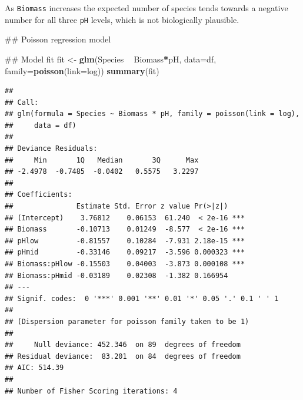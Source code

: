 \documentclass[]{book}
\newenvironment{Shaded}{\begin{snugshade}}{\end{snugshade}}
\newcommand{\KeywordTok}[1]{\textcolor[rgb]{0.13,0.29,0.53}{\textbf{#1}}}
\newcommand{\DataTypeTok}[1]{\textcolor[rgb]{0.13,0.29,0.53}{#1}}
\newcommand{\StringTok}[1]{\textcolor[rgb]{0.31,0.60,0.02}{#1}}
\newcommand{\OperatorTok}[1]{\textcolor[rgb]{0.81,0.36,0.00}{\textbf{#1}}}
\newcommand{\NormalTok}[1]{#1}
\theoremstyle{definition}
\theoremstyle{definition}
\theoremstyle{definition}
\theoremstyle{remark}
\begin{document}
As \texttt{Biomass} increases the expected number of species tends
towards a negative number for all three \texttt{pH} levels, which is not
biologically plausible.

\begin{Shaded}
\begin{Highlighting}[]
\NormalTok{## Poisson regression model}

\NormalTok{## Model fit}
\NormalTok{fit <-}\StringTok{ }\KeywordTok{glm}\NormalTok{(Species }\OperatorTok{~}\StringTok{ }\NormalTok{Biomass}\OperatorTok{*}\NormalTok{pH, }\DataTypeTok{data=}\NormalTok{df, }\DataTypeTok{family=}\KeywordTok{poisson}\NormalTok{(}\DataTypeTok{link=}\NormalTok{log))}
\KeywordTok{summary}\NormalTok{(fit)}
\end{Highlighting}
\end{Shaded}

\begin{verbatim}
## 
## Call:
## glm(formula = Species ~ Biomass * pH, family = poisson(link = log), 
##     data = df)
## 
## Deviance Residuals: 
##     Min       1Q   Median       3Q      Max  
## -2.4978  -0.7485  -0.0402   0.5575   3.2297  
## 
## Coefficients:
##               Estimate Std. Error z value Pr(>|z|)    
## (Intercept)    3.76812    0.06153  61.240  < 2e-16 ***
## Biomass       -0.10713    0.01249  -8.577  < 2e-16 ***
## pHlow         -0.81557    0.10284  -7.931 2.18e-15 ***
## pHmid         -0.33146    0.09217  -3.596 0.000323 ***
## Biomass:pHlow -0.15503    0.04003  -3.873 0.000108 ***
## Biomass:pHmid -0.03189    0.02308  -1.382 0.166954    
## ---
## Signif. codes:  0 '***' 0.001 '**' 0.01 '*' 0.05 '.' 0.1 ' ' 1
## 
## (Dispersion parameter for poisson family taken to be 1)
## 
##     Null deviance: 452.346  on 89  degrees of freedom
## Residual deviance:  83.201  on 84  degrees of freedom
## AIC: 514.39
## 
## Number of Fisher Scoring iterations: 4
\end{verbatim}
\end{document}
